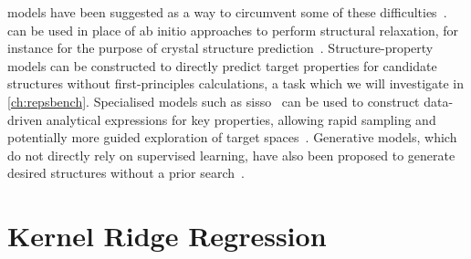 \ml models have been suggested as a way to circumvent some of these difficulties~\cite{rtml2012Aq,hl2021q}. \mlps can be used in place of ab initio approaches to perform structural relaxation, for instance for the purpose of crystal structure prediction~\cite{ptso2019q}. Structure-property models can be constructed to directly predict target properties for candidate structures without first-principles calculations, a task which we will investigate in \cref{ch:repsbench}. Specialised \ml models such as \gls{sisso}~\cite{ocsg2018q} can be used to construct data-driven analytical expressions for key properties, allowing rapid sampling and potentially more guided exploration of target spaces~\cite{fpsg2022q}. Generative models, which do not directly rely on supervised learning, have also been proposed to generate desired structures without a prior search~\cite{sg2020q,ggms2022q,tlmr2022q,wgbm2022a,bjbj2022a,mr2022q}.


\section{Kernel Ridge Regression}
\label{sec:ml-krr}


